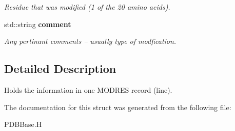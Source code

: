 \begin{CompactItemize}
\begin{CompactList}\small\item\em Residue that was modified (1 of the 20 amino acids). \item\end{CompactList}\item 
std::string \bf{comment}\label{structSimSite3D_1_1PDBBase_1_1modres__record__type_765eead7dea06482d5b3fe2dbcd4eed0}

\begin{CompactList}\small\item\em Any pertinant comments -- usually type of modfication. \item\end{CompactList}\end{CompactItemize}


\subsection{Detailed Description}
Holds the information in one MODRES record (line). 



The documentation for this struct was generated from the following file:\begin{CompactItemize}
\item 
PDBBase.H\end{CompactItemize}
